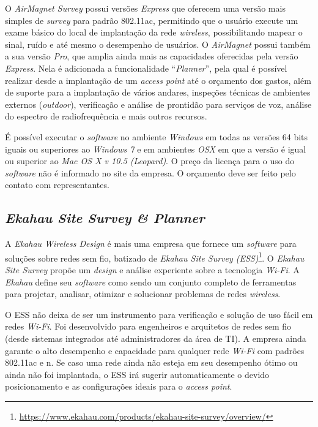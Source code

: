 \documentclass[
	12pt,				%
	twoside,			%
	a4paper,			%
	english,			%
	french,				%
	spanish,			%
	brazil				%
	]{abntex2}
\begin{document}
O \emph{AirMagnet Survey} possui versões \emph{Express} que oferecem uma
versão mais simples de \emph{survey} para padrão 802.11ac, permitindo
que o usuário execute um exame básico do local de implantação da rede
\emph{wireless}, possibilitando mapear o sinal, ruído e até mesmo o
desempenho de usuários. O \emph{AirMagnet} possui também a sua versão
\emph{Pro}, que amplia ainda mais as capacidades oferecidas pela versão
\emph{Express}. Nela é adicionada a funcionalidade ``\emph{Planner}'',
pela qual é possível realizar desde a implantação de um \emph{access
point} até o orçamento dos gastos, além de suporte para a implantação de
vários andares, inspeções técnicas de ambientes externos
(\emph{outdoor}), verificação e análise de prontidão para serviços de
voz, análise do espectro de radiofrequência e mais outros recursos.

É possível executar o \emph{software} no ambiente \emph{Windows} em
todas as versões 64 bits iguais ou superiores ao \emph{Windows 7} e em
ambientes \emph{OSX} em que a versão é igual ou superior ao \emph{Mac OS
X v 10.5 (Leopard)}. O preço da licença para o uso do \emph{software}
não é informado no site da empresa. O orçamento deve ser feito pelo
contato com representantes.

\subsection{\texorpdfstring{\emph{Ekahau Site Survey \&
Planner}}{Ekahau Site Survey \& Planner}}\label{ekahau-site-survey-planner}

A \emph{Ekahau Wireless Design} é mais uma empresa que fornece um
\emph{software} para soluções sobre redes sem fio, batizado de
\emph{Ekahau Site Survey (ESS)}\footnote{\url{https://www.ekahau.com/products/ekahau-site-survey/overview/}}.
O \emph{Ekahau Site Survey} propõe um \emph{design} e análise experiente
sobre a tecnologia \emph{Wi-Fi}. A \emph{Ekahau} define seu
\emph{software} como sendo um conjunto completo de ferramentas para
projetar, analisar, otimizar e solucionar problemas de redes
\emph{wireless}.

O ESS não deixa de ser um instrumento para verificação e solução de uso
fácil em redes \emph{Wi-Fi}. Foi desenvolvido para engenheiros e
arquitetos de redes sem fio (desde sistemas integrados até
administradores da área de TI). A empresa ainda garante o alto
desempenho e capacidade para qualquer rede \emph{Wi-Fi} com padrões
802.11ac e n. Se caso uma rede ainda não esteja em seu desempenho ótimo
ou ainda não foi implantada, o ESS irá sugerir automaticamente o devido
posicionamento e as configurações ideais para o \emph{access point}.
\end{document}

